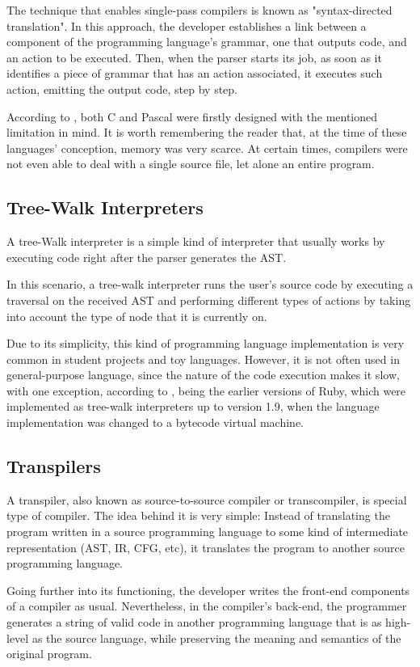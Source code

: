 The technique that enables single-pass compilers is known as "syntax-directed translation". In this approach, the developer establishes a link between a component of the programming language's grammar, one that outputs code, and an action to be executed. Then, when the parser starts its job, as soon as it identifies a piece of grammar that has an action associated, it executes such action, emitting the output code, step by step.

According to \cite{nystrom2021crafting}, both C and Pascal were firstly designed with the mentioned limitation in mind. It is worth remembering the reader that, at the time of these languages' conception, memory was very scarce. At certain times, compilers were not even able to deal with a single source file, let alone an entire program.

\subsection{Tree-Walk Interpreters}
A tree-Walk interpreter is a simple kind of interpreter that usually works by executing code right after the parser generates the AST.

In this scenario, a tree-walk interpreter runs the user's source code by executing a traversal on the received AST and performing different types of actions by taking into account the type of node that it is currently on.

Due to its simplicity, this kind of programming language implementation is very common in student projects and toy languages. However, it is not often used in general-purpose language, since the nature of the code execution makes it slow, with one exception, according to \cite{nystrom2021crafting}, being the earlier versions of Ruby, which were implemented as tree-walk interpreters up to version 1.9, when the language implementation was changed to a bytecode virtual machine.

\subsection{Transpilers}
A transpiler, also known as source-to-source compiler or transcompiler, is special type of compiler. The idea behind it is very simple: Instead of translating the program written in a source programming language to some kind of intermediate representation (AST, IR, CFG, etc), it translates the program to another source programming language.

Going further into its functioning, the developer writes the front-end components of a compiler as usual. Nevertheless, in the compiler's back-end, the programmer generates a string of valid code in another programming language that is as high-level as the source language, while preserving the meaning and semantics of the original program.


